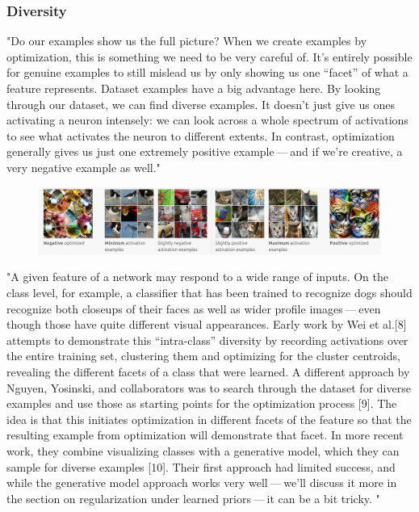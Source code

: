 \documentclass[]{scrartcl}
\begin{document}
\subsubsection{Diversity}
"Do our examples show us the full picture? When we create examples by optimization, this is something we need to be very careful of. It’s entirely possible for genuine examples to still mislead us by only showing us one “facet” of what a feature represents.  Dataset examples have a big advantage here. By looking through our dataset, we can ﬁnd diverse examples. It doesn't just give us ones activating a neuron intensely: we can look across a whole spectrum of activations to see what activates the neuron to different extents. In contrast, optimization generally gives us just one extremely positive example --- and if we’re creative, a very negative example as well." \cite{Olah2017}
\begin{figure}[h]
	\centering
	\includegraphics[width=1\linewidth]{Diversity}
\end{figure}
"A given feature of a network may respond to a wide range of inputs. On the class level, for example, a classiﬁer that has been trained to recognize dogs should recognize both closeups of their faces as well as wider proﬁle images --- even though those have quite different visual appearances. Early work by Wei et al.[8] attempts to demonstrate this “intra-class” diversity by recording activations over the entire training set, clustering them and optimizing for the cluster centroids, revealing the different facets of a class that were learned. A different approach by Nguyen, Yosinski, and collaborators was to search through the dataset for diverse examples and use those as starting points for the optimization process [9]. The idea is that this initiates optimization in different facets of the feature so that the resulting example from optimization will demonstrate that facet. In more recent work, they combine visualizing classes with a generative model, which they can sample for diverse examples [10]. Their ﬁrst approach had limited success, and while the generative model approach works very well --- we’ll discuss it more in the section on regularization under learned priors --- it can be a bit tricky. " \cite{Olah2017}
\end{document}
